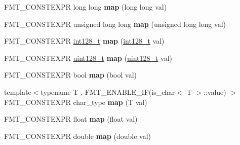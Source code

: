 \begin{DoxyCompactItemize}
F\+M\+T\+\_\+\+C\+O\+N\+S\+T\+E\+X\+PR long long {\bfseries map} (long long val)
\item 
\mbox{\label{structinternal_1_1arg__mapper_a95775b0c79bf424d75defc81b8d3ce5b}} 
F\+M\+T\+\_\+\+C\+O\+N\+S\+T\+E\+X\+PR unsigned long long {\bfseries map} (unsigned long long val)
\item 
\mbox{\label{structinternal_1_1arg__mapper_aaaa8afd69976ea6e3850ad27c2d28671}} 
F\+M\+T\+\_\+\+C\+O\+N\+S\+T\+E\+X\+PR \hyperlink{structinternal_1_1int128__t}{int128\+\_\+t} {\bfseries map} (\hyperlink{structinternal_1_1int128__t}{int128\+\_\+t} val)
\item 
\mbox{\label{structinternal_1_1arg__mapper_acd70e072c045246c665b49cd3afe9891}} 
F\+M\+T\+\_\+\+C\+O\+N\+S\+T\+E\+X\+PR \hyperlink{structinternal_1_1uint128__t}{uint128\+\_\+t} {\bfseries map} (\hyperlink{structinternal_1_1uint128__t}{uint128\+\_\+t} val)
\item 
\mbox{\label{structinternal_1_1arg__mapper_a48a267e2b30dabcf6e6d37fc6cf28884}} 
F\+M\+T\+\_\+\+C\+O\+N\+S\+T\+E\+X\+PR bool {\bfseries map} (bool val)
\item 
\mbox{\label{structinternal_1_1arg__mapper_aebb78ed7c8d4a3865c2d05cff53dedf7}} 
{\footnotesize template$<$typename T , F\+M\+T\+\_\+\+E\+N\+A\+B\+L\+E\+\_\+\+I\+F(is\+\_\+char$<$ T $>$\+::value) $>$ }\\F\+M\+T\+\_\+\+C\+O\+N\+S\+T\+E\+X\+PR char\+\_\+type {\bfseries map} (T val)
\item 
\mbox{\label{structinternal_1_1arg__mapper_af37150e72d7cde53eb6a983fe84ddc2d}} 
F\+M\+T\+\_\+\+C\+O\+N\+S\+T\+E\+X\+PR float {\bfseries map} (float val)
\item 
\mbox{\label{structinternal_1_1arg__mapper_ac896cec62ac6f50620b687efe0e7251e}} 
F\+M\+T\+\_\+\+C\+O\+N\+S\+T\+E\+X\+PR double {\bfseries map} (double val)
\item 
\mbox{\label{structinternal_1_1arg__mapper_a9e68a437dee046fbccc4009f2c613b84}} 

\end{DoxyCompactItemize}
